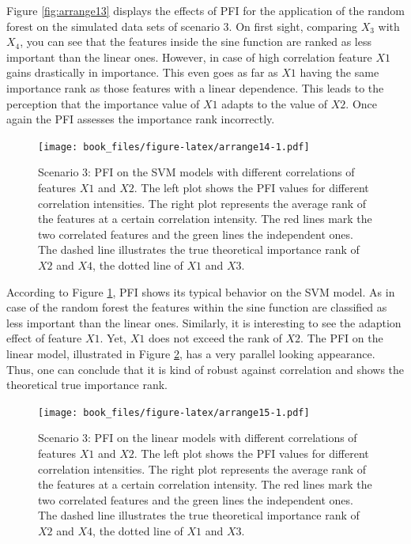 \documentclass[
]{krantz}
\begin{document}
Figure \ref{fig:arrange13} displays the effects of PFI for the application of the random forest on the simulated data sets of scenario 3. On first sight, comparing \(X_3\) with \(X_4\), you can see that the features inside the sine function are ranked as less important than the linear ones. However, in case of high correlation feature \(X1\) gains drastically in importance. This even goes as far as \(X1\) having the same importance rank as those features with a linear dependence. This leads to the perception that the importance value of \(X1\) adapts to the value of \(X2\). Once again the PFI assesses the importance rank incorrectly.

\begin{figure}
\centering
\texttt{[image: book\_files/figure-latex/arrange14-1.pdf]}
\caption{\label{fig:arrange14}Scenario 3: PFI on the SVM models with different correlations of features \(X1\) and \(X2\). The left plot shows the PFI values for different correlation intensities. The right plot represents the average rank of the features at a certain correlation intensity. The red lines mark the two correlated features and the green lines the independent ones. The dashed line illustrates the true theoretical importance rank of \(X2\) and \(X4\), the dotted line of \(X1\) and \(X3\).}
\end{figure}

According to Figure \ref{fig:arrange14}, PFI shows its typical behavior on the SVM model. As in case of the
random forest the features within the sine function are classified as less important than the linear ones. Similarly, it is interesting to see the adaption effect of feature \(X1\). Yet, \(X1\) does not exceed the rank of \(X2\). The PFI on the linear model, illustrated in Figure \ref{fig:arrange15}, has a very parallel looking appearance. Thus, one can conclude that it is kind of robust against correlation and shows the theoretical true importance rank.

\begin{figure}
\centering
\texttt{[image: book\_files/figure-latex/arrange15-1.pdf]}
\caption{\label{fig:arrange15}Scenario 3: PFI on the linear models with different correlations of features \(X1\) and \(X2\). The left plot shows the PFI values for different correlation intensities. The right plot represents the average rank of the features at a certain correlation intensity. The red lines mark the two correlated features and the green lines the independent ones. The dashed line illustrates the true theoretical importance rank of \(X2\) and \(X4\), the dotted line of \(X1\) and \(X3\).}
\end{figure}
\end{document}
